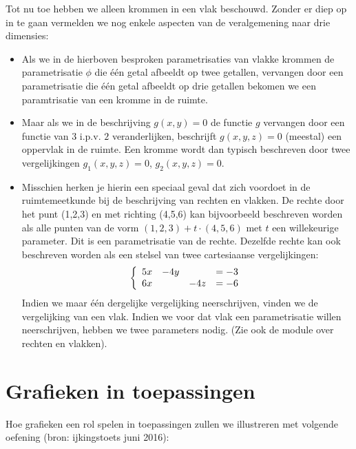 \documentclass{ximera}
\begin{document}
Tot nu toe hebben we alleen krommen in een vlak beschouwd. Zonder er diep
op in te gaan vermelden we nog enkele aspecten van de veralgemening
naar drie dimensies:
\begin{itemize}
\item Als we in de hierboven besproken parametrisaties
van vlakke krommen de parametrisatie $\phi$ die \'e\'en getal afbeeldt
op twee getallen, vervangen door een parametrisatie die \'e\'en getal
afbeeldt op drie getallen bekomen we een paramtrisatie van een
kromme in de ruimte.
\item Maar als we in de beschrijving $g(x,y)=0$ de functie $g$
  vervangen door een functie van $3$ i.p.v. $2$ veranderlijken,
  beschrijft $g(x,y,z)=0$ (meestal) een oppervlak in de ruimte. Een
  kromme wordt dan typisch beschreven door twee vergelijkingen
  $g_1(x,y,z)=0$, $g_2(x,y,z)=0$.
\item Misschien herken je hierin een
  speciaal geval dat zich voordoet in de ruimtemeetkunde bij de
  beschrijving van rechten en vlakken.  De rechte door het punt
  (1,2,3) en met richting (4,5,6) kan bijvoorbeeld
  beschreven worden als alle punten van de vorm
  $(1,2,3)+t\cdot(4,5,6)$ met $t$ een willekeurige
  parameter. Dit is een parametrisatie van de rechte. Dezelfde
  rechte kan ook beschreven worden als een stelsel van twee cartesiaanse vergelijkingen:
\[
\left\{\ba{llll} 5 x & -4 y &  & = -3 \\
                 6 x  &      & - 4 z &=-6
\ea\right.
\]
Indien we maar \'e\'en dergelijke vergelijking neerschrijven, vinden
we de vergelijking van een vlak. Indien we voor dat vlak een
parametrisatie willen neerschrijven, hebben we twee parameters
nodig. (Zie ook de module over rechten en vlakken).

\end{itemize}

\section{Grafieken in toepassingen}
Hoe grafieken een rol spelen in toepassingen zullen we illustreren met volgende oefening (bron: ijkingstoets juni 2016):
\end{document}
